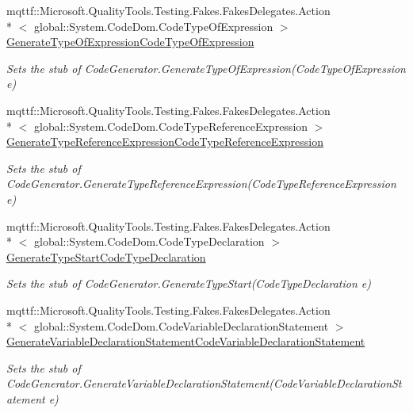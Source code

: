 \begin{DoxyCompactItemize}
mqttf\-::\-Microsoft.\-Quality\-Tools.\-Testing.\-Fakes.\-Fakes\-Delegates.\-Action\\*
$<$ global\-::\-System.\-Code\-Dom.\-Code\-Type\-Of\-Expression $>$ \hyperlink{class_system_1_1_code_dom_1_1_compiler_1_1_fakes_1_1_stub_code_generator_a320539887fa3fa3fcafe1f7d83fb25b9}{Generate\-Type\-Of\-Expression\-Code\-Type\-Of\-Expression}
\begin{DoxyCompactList}\small\item\em Sets the stub of Code\-Generator.\-Generate\-Type\-Of\-Expression(\-Code\-Type\-Of\-Expression e)\end{DoxyCompactList}\item 
mqttf\-::\-Microsoft.\-Quality\-Tools.\-Testing.\-Fakes.\-Fakes\-Delegates.\-Action\\*
$<$ global\-::\-System.\-Code\-Dom.\-Code\-Type\-Reference\-Expression $>$ \hyperlink{class_system_1_1_code_dom_1_1_compiler_1_1_fakes_1_1_stub_code_generator_a0c91e3d432b8dfcd9fa885319c08b5e9}{Generate\-Type\-Reference\-Expression\-Code\-Type\-Reference\-Expression}
\begin{DoxyCompactList}\small\item\em Sets the stub of Code\-Generator.\-Generate\-Type\-Reference\-Expression(\-Code\-Type\-Reference\-Expression e)\end{DoxyCompactList}\item 
mqttf\-::\-Microsoft.\-Quality\-Tools.\-Testing.\-Fakes.\-Fakes\-Delegates.\-Action\\*
$<$ global\-::\-System.\-Code\-Dom.\-Code\-Type\-Declaration $>$ \hyperlink{class_system_1_1_code_dom_1_1_compiler_1_1_fakes_1_1_stub_code_generator_a1ffd340fef2f92f6b9f8f59b7199e064}{Generate\-Type\-Start\-Code\-Type\-Declaration}
\begin{DoxyCompactList}\small\item\em Sets the stub of Code\-Generator.\-Generate\-Type\-Start(\-Code\-Type\-Declaration e)\end{DoxyCompactList}\item 
mqttf\-::\-Microsoft.\-Quality\-Tools.\-Testing.\-Fakes.\-Fakes\-Delegates.\-Action\\*
$<$ global\-::\-System.\-Code\-Dom.\-Code\-Variable\-Declaration\-Statement $>$ \hyperlink{class_system_1_1_code_dom_1_1_compiler_1_1_fakes_1_1_stub_code_generator_a24e7bc0b0bf6d3c04b8db53d43e069d6}{Generate\-Variable\-Declaration\-Statement\-Code\-Variable\-Declaration\-Statement}
\begin{DoxyCompactList}\small\item\em Sets the stub of Code\-Generator.\-Generate\-Variable\-Declaration\-Statement(\-Code\-Variable\-Declaration\-Statement e)\end{DoxyCompactList}\item 

\end{DoxyCompactItemize}
